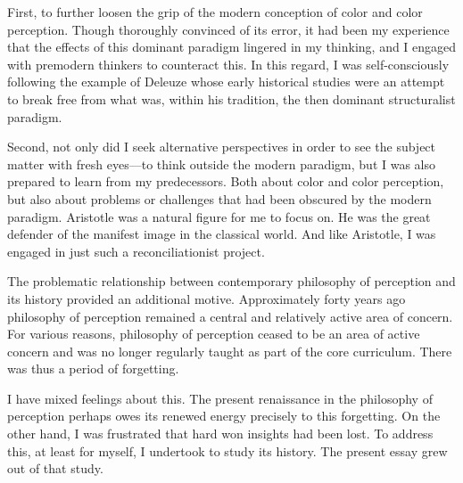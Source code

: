 First, to further loosen the grip of the modern conception of color and color perception. Though thoroughly convinced of its error, it had been my experience that the effects of this dominant paradigm lingered in my thinking, and I engaged with premodern thinkers to counteract this. In this regard, I was self-consciously following the example of Deleuze whose early historical studies were an attempt to break free from what was, within his tradition, the then dominant structuralist paradigm.

Second, not only did I seek alternative perspectives in order to see the subject matter with fresh eyes---to think outside the modern paradigm, but I was also prepared to learn from my predecessors. Both about color and color perception, but also about problems or challenges that had been obscured by the modern paradigm. Aristotle was a natural figure for me to focus on. He was the great defender of the manifest image in the classical world. And like Aristotle, I was engaged in just such a reconciliationist project.

The problematic relationship between contemporary philosophy of perception and its history provided an additional motive. Approximately forty years ago philosophy of perception remained a central and relatively active area of concern. For various reasons, philosophy of perception ceased to be an area of active concern and was no longer regularly taught as part of the core curriculum. There was thus a period of forgetting. 

I have mixed feelings about this. The present renaissance in the philosophy of perception perhaps owes its renewed energy precisely to this forgetting. On the other hand, I was frustrated that hard won insights had been lost. To address this, at least for myself, I undertook to study its history. The present essay grew out of that study.

